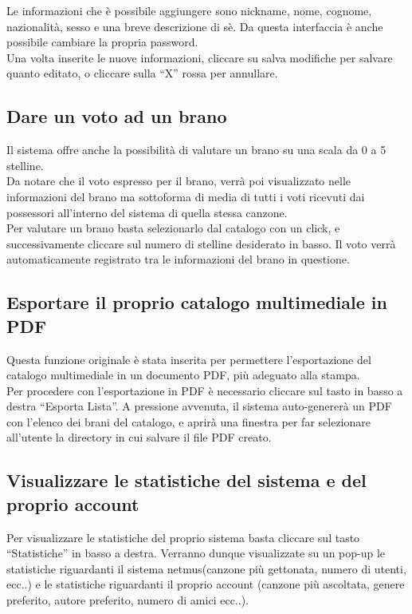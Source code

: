 Le informazioni che \`e possibile aggiungere sono nickname, nome, cognome,
nazionalit\`a, sesso e una breve descrizione di s\`e. Da questa interfaccia \`e
anche possibile cambiare la propria password.\\
Una volta inserite le nuove informazioni, cliccare su salva modifiche per
salvare quanto editato, o cliccare sulla ``X'' rossa per annullare.

\subsection*{Dare un voto ad un brano}

Il sistema  offre anche la possibilit\`a di valutare un brano su una
scala da 0 a 5 stelline.\\
Da notare che il voto espresso per il brano, verr\`a poi visualizzato nelle
informazioni del brano ma sottoforma di media di tutti i voti ricevuti dai
possessori all'interno del sistema  di quella stessa canzone.\\
Per valutare un brano basta selezionarlo dal catalogo con un click, e
successivamente cliccare sul numero di stelline desiderato in basso. Il voto
verr\`a automaticamente registrato tra le informazioni del brano in questione.

\subsection*{Esportare il proprio catalogo multimediale in PDF}

Questa funzione originale \`e stata inserita per permettere l'esportazione del
catalogo multimediale in un documento PDF, pi\`u adeguato alla stampa.\\
Per procedere con l'esportazione in PDF \`e necessario cliccare sul tasto in
basso a destra ``Esporta Lista''. A pressione avvenuta, il sistema
auto-generer\`a un PDF con l'elenco dei brani del catalogo, e aprir\`a una
finestra per far selezionare all'utente la directory in cui salvare il file PDF
creato.

\subsection*{Visualizzare le statistiche del sistema e del proprio account}

Per visualizzare le statistiche del proprio sistema basta cliccare sul tasto
``Statistiche'' in basso a destra. Verranno dunque visualizzate su un pop-up le
statistiche riguardanti il sistema netmus(canzone pi\`u gettonata, numero di
utenti, ecc..) e le statistiche riguardanti il proprio account (canzone pi\`u
ascoltata, genere preferito, autore preferito, numero di amici ecc..).




